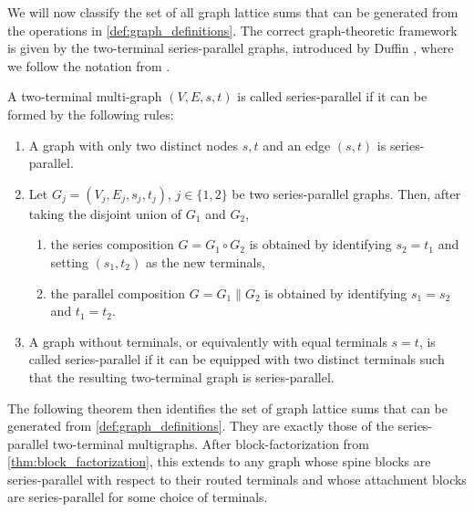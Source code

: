 \documentclass[]{amsart}
\numberwithin{mythm}{section}
\begin{document}
We will now classify the set of all graph lattice sums that can be generated from the operations in \cref{def:graph_definitions}. The correct graph-theoretic framework is given by the two-terminal series-parallel graphs, introduced by Duffin \cite{Duffin1965}, where we follow the notation from \cite[Sec.~8.3]{Bodlaender1998}.

\begin{definition}
    \label{def:sp_graphs}
    A two-terminal multi-graph $(V,E,s,t)$ is called series-parallel if it can be formed by the following rules:
    \begin{enumerate}
        \item A graph with only two distinct nodes $s,t$ and an edge $(s,t)$ is series-parallel.
        \item Let $G_j=(V_j,E_j,s_j,t_j)$, $j\in\{1,2\}$ be two series-parallel graphs. Then, after taking the disjoint union of $G_1$ and $G_2$,
        \begin{enumerate}
            \item the series composition $G=G_1\circ G_2$ is obtained by identifying $s_2=t_1$ and setting $(s_1,t_2)$ as the new terminals,
            \item the parallel composition $G=G_1 \parallel G_2$ is obtained by identifying $s_1=s_2$ and $t_1=t_2$. 
        \end{enumerate}
        \item A graph without terminals, or equivalently with equal terminals $s=t$, is called series-parallel if it can be equipped with two distinct terminals such that the resulting two-terminal graph is series-parallel.
    \end{enumerate}
\end{definition}

The following theorem then identifies the set of graph lattice sums that can be generated from \cref{def:graph_definitions}. They are exactly those of the series-parallel two-terminal multigraphs. After block-factorization from \cref{thm:block_factorization}, this extends to any graph whose spine blocks are series-parallel with respect to their routed terminals and whose attachment blocks are series-parallel for some choice of terminals.
\end{document}
